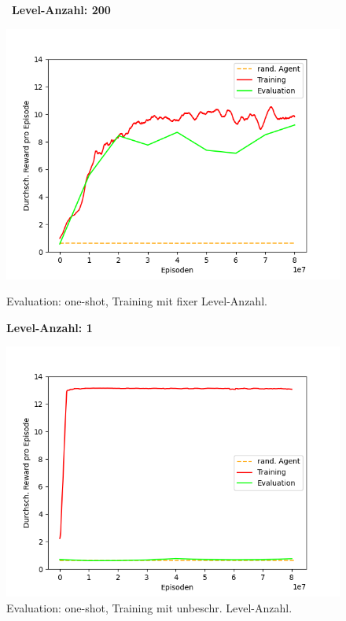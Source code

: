 \begin{figure}[htp!]
   \centering
   \captionsetup{width=0.45\linewidth} 
    \begin{minipage}{0.48\linewidth}
        \centering\
        \textbf{Level-Anzahl: 200}\par\medskip
        \includegraphics[scale=0.5]{abb/_graphen/floor_80Mio_200lvl_15act_Training_evalAsTraining}
        \caption{Evaluation: one-shot, Training mit fixer Level-Anzahl.}
        \label{fig:grph_floor_80Mio_200lvl_15act_evalAsTraining_1}
    \end{minipage}
    \centering
    \begin{minipage}{0.48\linewidth}
        \centering
        \textbf{Level-Anzahl: 1}\par\medskip
        \includegraphics[scale=0.5]{abb/_graphen/floor_80Mio_1lvl_15act_Training_evalAsTraining}
        \caption{Evaluation: one-shot, Training mit unbeschr. Level-Anzahl.}
        \label{fig:grph_floor_80Mio_1lvl_15act_evalAsTraining}
    \end{minipage}
\end{figure}

